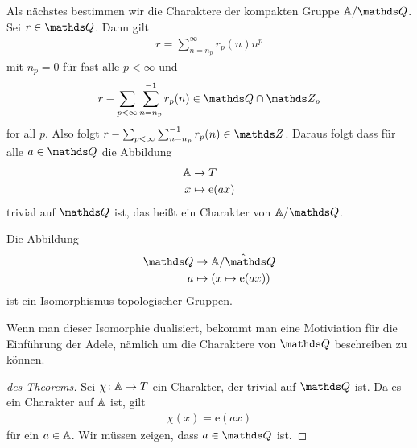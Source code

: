 Als nächstes bestimmen wir die Charaktere der kompakten Gruppe $\A/\Q$.
Sei $r\in \Q$. Dann gilt
\begin{align*}
r=\sum_{n=n_p}^\infty r_p(n)n^p
\end{align*}
mit $n_p=0$ für fast alle $p<\infty$ und
\begin{align*}
r-\sum_{p<\infty} \sum_{n=n_p}^{-1}r_p(n) \in \Q \cap \Z_p
\end{align*}
for all $p$. Also folgt $r-\sum_{p<\infty} \sum_{n=n_p}^{-1}r_p(n) \in \Z$.
Daraus folgt dass für alle $a\in \Q$ die Abbildung
\begin{align*}
\mathbb{A} &\to T\\
x &\mapsto \mathrm{e}(ax)
\end{align*}
trivial auf $\Q$ ist, das heißt ein Charakter von $\A / \Q$.

\begin{thm}
Die Abbildung
\begin{align*}
\Q &\to \hat{\A/\Q}\\
a &\mapsto (x \mapsto \mathrm{e}(ax))
\end{align*}
ist ein Isomorphismus topologischer Gruppen.
\end{thm}
\begin{bem}
Wenn man dieser Isomorphie dualisiert, bekommt man eine Motiviation für die Einführung der Adele, nämlich um die Charaktere von $\Q$ beschreiben zu können.
\end{bem}
\begin{proof}[des Theorems]
Sei $\chi \colon \mathbb{A} \to T$ ein Charakter, der trivial auf $\Q$ ist.
Da es ein Charakter auf $\mathbb{A}$ ist, gilt
\begin{align*}
\chi(x)=\mathrm{e}(ax)
\end{align*}
für ein $a\in \mathbb{A}$.
Wir müssen zeigen, dass $a\in \Q$ ist.
\end{proof}
